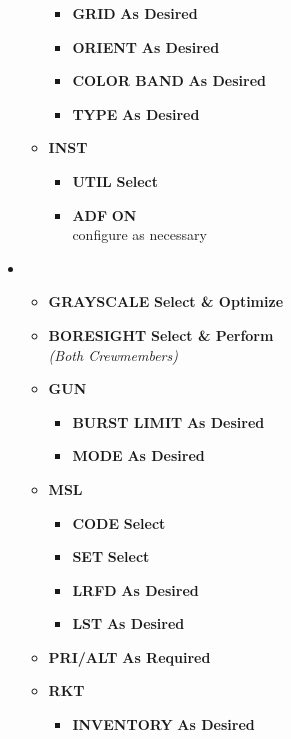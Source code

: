 \documentclass[fontHelvetica]{TechCheck}
\begin{document}
\begin{itemize}[leftmargin=0.1\linewidth,rightmargin=0.1\linewidth, itemsep=4pt]
\begin{itemize}[itemsep=4pt]
			\begin{itemize}[itemsep=4pt]
				\item \textbf{GRID} \dotfill \textbf{As Desired}
				\item \textbf{ORIENT} \dotfill \textbf{As Desired}
				\item \textbf{COLOR BAND} \dotfill \textbf{As Desired}
				\item \textbf{TYPE} \dotfill \textbf{As Desired}
			\end{itemize}
			\item \textbf{INST}
			\begin{itemize}[itemsep=4pt]
				\item \textbf{UTIL} \dotfill \textbf{Select}
				\item \textbf{ADF} \dotfill \textbf{ON} \\
				\hfill configure as necessary
			\end{itemize}
		\end{itemize}
		\item {}
		\begin{itemize}[itemsep=4pt]
			\item \textbf{GRAYSCALE} \dotfill \textbf{Select \& Optimize}
			\item \textbf{BORESIGHT} \dotfill \textbf{Select \& Perform} \\
			\hfill \emph{(Both Crewmembers)}
			\item \textbf{GUN}
			\begin{itemize}[itemsep=4pt]
				\item \textbf{BURST LIMIT} \dotfill \textbf{As Desired}
				\item \textbf{MODE} \dotfill \textbf{As Desired}
			\end{itemize}
			\item \textbf{MSL}
			\begin{itemize}[itemsep=4pt]
				\item \textbf{CODE} \dotfill \textbf{Select}
				\item \textbf{SET} \dotfill \textbf{Select}
				\item \textbf{LRFD} \dotfill \textbf{As Desired}
				\item \textbf{LST} \dotfill \textbf{As Desired}
			\end{itemize}
			\item \textbf{PRI/ALT} \dotfill \textbf{As Required}
			\item \textbf{RKT}
			\begin{itemize}[itemsep=4pt]
				\item \textbf{INVENTORY} \dotfill \textbf{As Desired}

\end{itemize}
\end{itemize}
\end{itemize}
\end{document}
